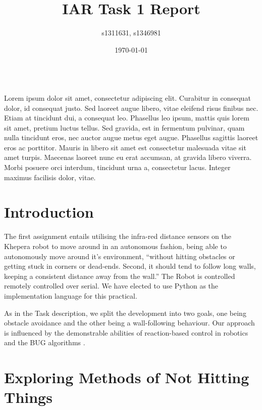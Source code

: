 \documentclass[11pt, a4paper]{article}
\renewenvironment{abstract}{%
{\mdseries\scshape\Large\abstractname}
\vspace{1em}\\
}{\par\noindent}
\begin{document}
\title{IAR Task 1 Report}
\author{s1311631, s1346981}
\date{\today}
\maketitle


\begin{abstract}
  Lorem ipsum dolor sit amet, consectetur adipiscing elit. Curabitur in consequat dolor, id consequat justo. Sed laoreet augue libero, vitae eleifend risus finibus nec. Etiam at tincidunt dui, a consequat leo. Phasellus leo ipsum, mattis quis lorem sit amet, pretium luctus tellus. Sed gravida, est in fermentum pulvinar, quam nulla tincidunt eros, nec auctor augue metus eget augue. Phasellus sagittis laoreet eros ac porttitor. Mauris in libero sit amet est consectetur malesuada vitae sit amet turpis. Maecenas laoreet nunc eu erat accumsan, at gravida libero viverra. Morbi posuere orci interdum, tincidunt urna a, consectetur lacus. Integer maximus facilisis dolor, vitae.
\end{abstract}


\section{Introduction}

The first assignment entails utilising the infra-red distance sensors on the Khepera 
robot to move around in an autonomous fashion, being able to autonomously move around 
it's environment, ``without hitting obstacles or getting stuck in corners or dead-ends. 
Second, it should tend to follow long walls, keeping a consistent distance away from 
the wall.'' The Robot is controlled remotely controlled over serial. We have 
elected to use Python as the implementation language for this practical.

As in the Task description, we split the development into two goals, one being obstacle 
avoidance and the other being a wall-following behaviour. Our approach is influenced 
by the demonstrable abilities of reaction-based control in robotics and the BUG 
algorithms \cite{principlesrobot}.


\section{Exploring Methods of Not Hitting Things}
\end{document}
